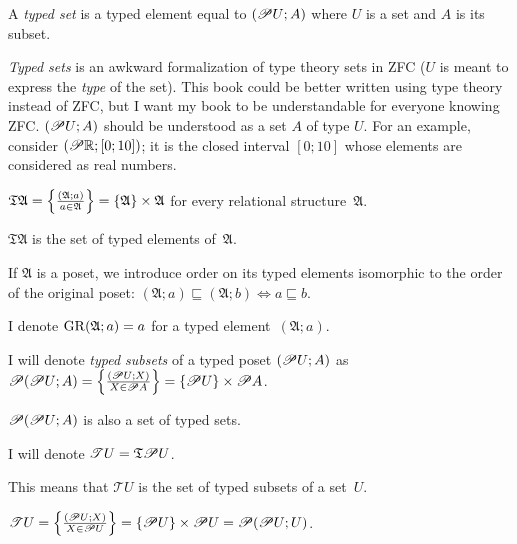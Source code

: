 \begin{defn}
A \emph{typed set} is a typed
element equal to $(\mathscr{P} U;A)$ where $U$ is a set and $A$ is
its subset.\end{defn}
\begin{rem}
\emph{Typed sets} is an awkward formalization of type theory sets
in ZFC ($U$ is meant to express the \emph{type} of the set). This
book could be better written using type theory instead of ZFC, but
I want my book to be understandable for everyone knowing ZFC. $(\mathscr{P} U;A)$
should be understood as a set $A$ of type $U$. For an example, consider
$(\mathscr{P}\mathbb{R};[0;10])$; it is the closed interval $[0;10]$
whose elements are considered as real numbers.\end{rem}
\begin{defn}
$\mathfrak{T}\mathfrak{A}=\left\{ \frac{(\mathfrak{A};a)}{a\in\mathfrak{A}}\right\}=\{\mathfrak{A}\}\times\mathfrak{A}$
for every relational structure~$\mathfrak{A}$.\end{defn}
\begin{rem}
$\mathfrak{T}\mathfrak{A}$ is the set of typed elements of~$\mathfrak{A}$.
\end{rem}

\begin{defn}
If $\mathfrak{A}$ is a poset, we introduce order on its typed elements
isomorphic to the order of the original poset: $(\mathfrak{A};a)\sqsubseteq(\mathfrak{A};b)\Leftrightarrow a\sqsubseteq b$.
\end{defn}

\begin{defn}
I denote $\operatorname{GR}(\mathfrak{A};a)=a$ for a typed element~$(\mathfrak{A};a)$.
\end{defn}

\begin{defn}
I will denote \emph{typed subsets} of a typed poset $(\mathscr{P} U;A)$
as $\mathscr{P}(\mathscr{P} U;A)=\left\{ \frac{(\mathscr{P} U;X)}{X\in\mathscr{P} A}\right\}=\{\mathscr{P} U\}\times\mathscr{P} A$.\end{defn}
\begin{obvious}
$\mathscr{P}(\mathscr{P} U;A)$ is also a set of typed sets.
\end{obvious}

\begin{defn}
I will denote $\mathscr{T}U=\mathfrak{T}\mathscr{P} U$.\end{defn}
\begin{rem}
This means that $\mathscr{T}U$ is the set of typed subsets of a set~$U$.\end{rem}
\begin{obvious}
$\mathscr{T}U=\left\{ \frac{(\mathscr{P} U;X)}{X\in\mathscr{P} U}\right\}=\{\mathscr{P} U\}\times\mathscr{P} U=\mathscr{P}(\mathscr{P} U;U)$.
\end{obvious}

